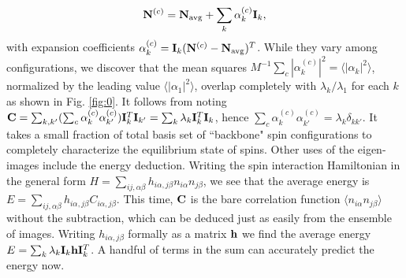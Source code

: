 \documentclass[reprint,amsmath,amssymb,aps,showpacs,superscriptaddress,prl]{revtex4-1}
\newcommand{\ba}{\begin{eqnarray}}
\newcommand{\ea}{\end{eqnarray}}
\renewcommand{\v}[1]{{\bf #1}}
\begin{document}
\ba \v N^{(c)} = \v N_{\rm avg} + \sum_k \alpha_k^{(c)} {\bf I}_k , \label{eq:alpha_k}\ea
with expansion coefficients $\alpha_k^{(c)} = {\bf I}_k (\v N^{(c)} - \v N_{\rm avg} )^T$. While they vary among configurations, we discover that the mean squares $M^{-1} \sum_c |\alpha_k^{(c)} |^2 = \langle | \alpha_k |^2 \rangle $, normalized by the leading value $\langle |\alpha_1 |^2 \rangle$, overlap completely with $\lambda_k /\lambda_1 $ for each $k$ as shown in Fig. \ref{fig:0}. It follows from noting ${\bf C} = \sum_{k,k'}  ( \sum_c \alpha_k^{(c)} \alpha_{k'}^{(c)} ) {\bf I}_k^T {\bf I}_{k'} = \sum_k \lambda_k {\bf I}_k^T {\bf I}_k$, hence $\sum_c \alpha_k^{(c)} \alpha_{k'}^{(c)}  = \lambda_k \delta_{kk'}$. It takes a small fraction of total basis set of ``backbone" spin configurations to completely characterize the equilibrium state of spins. Other uses of the eigen-images include the energy deduction. Writing the spin interaction Hamiltonian in the general form $H= \sum_{ij, \alpha\beta} h_{i\alpha, j\beta} n_{i\alpha} n_{j\beta}$, we see that the average energy is $E= \sum_{ij, \alpha\beta} h_{i\alpha, j\beta} C_{i\alpha, j\beta}$. This time, $\bf C$ is the bare correlation function $\langle n_{i\alpha}n_{j\beta} \rangle$ without the subtraction, which can be deduced just as easily from the ensemble of images. Writing $h_{i\alpha, j\beta}$ formally as a matrix $\bf h$ we find the average energy $E= \sum_k \lambda_k {\bf I}_k {\bf h} {\bf I}^T_k$. A handful of terms in the sum can accurately predict the energy now.
\end{document}
